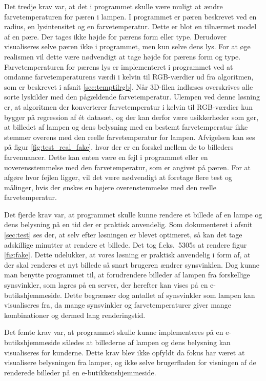 Det tredje krav var, at det i programmet skulle være muligt at ændre farvetemperaturen for pæren i lampen. I programmet er pæren beskrevet ved en radius, en lysintensitet og en farvetemperatur. Dette er blot en tilnærmet model af en pære. Der tages ikke højde for pærens form eller type. Derudover visualiseres selve pæren ikke i programmet, men kun selve dens lys. For at øge realismen vil dette være nødvendigt at tage højde for pærens form og type.
Farvetemperaturen for pærens lys er implementeret i programmet ved at omdanne farvetemperaturens værdi i kelvin til RGB-værdier ud fra algoritmen, som er beskrevet i afsnit \ref{sec:temptilrgb}. Når 3D-filen indlæses overskrives alle sorte lyskilder med den pågældende farvetemperatur. Ulempen ved denne løsning er, at algoritmen der konverterer farvetemperatur i kelvin til RGB-værdier kun bygger på regression af ét datasæt, og der kan derfor være usikkerheder som gør, at billedet af lampen og dens belysning med en bestemt farvetemperatur ikke stemmer overens med den reelle farvetemperatur for lampen. Afvigelsen kan ses på figur \ref{fig:test_real_fake}, hvor der er en forskel mellem de to billeders farvenuancer. Dette kan enten være en fejl i programmet eller en uoverensstemmelse med den farvetemperatur, som er angivet på pæren. For at afgøre hvor fejlen ligger, vil det være nødvendigt at foretage flere test og målinger, hvis der ønskes en højere overenstemmelse med den reelle farvetemperatur.

Det fjerde krav var, at programmet skulle kunne rendere et billede af en lampe og dens belysning på en tid der er praktisk anvendelig. Som dokumenteret i afsnit \ref{sec:test} ses der, at selv efter løsningen er blevet optimeret, så kan det tage adskillige minutter at rendere et billede. Det tog f.eks.\ 5305s at rendere figur \ref{fig:fake}. Dette udelukker, at vores løsning er praktisk anvendelig i form af, at der skal renderes et nyt billede så snart brugeren ændrer synsvinklen. Dog kunne man benytte programmet til, at forudrendere billeder af lampen fra forskellige synsvinkler, som lagres på en server, der herefter kan vises på en e-butikshjemmeside. Dette begrænser dog antallet af synsvinkler som lampen kan visualiseres fra, da mange synsvinkler og farvetemperaturer giver mange kombinationer og dermed lang renderingstid. 

Det femte krav var, at programmet skulle kunne implementeres på en e-butikshjemmeside således at billederne af lampen og dens belysning kan visualiseres for kunderne. Dette krav blev ikke opfyldt da fokus har været at visualisere belysningen fra lamper, og ikke selve brugerfladen for visningen af de renderede billeder på en e-butikkenshjemmeside.  

